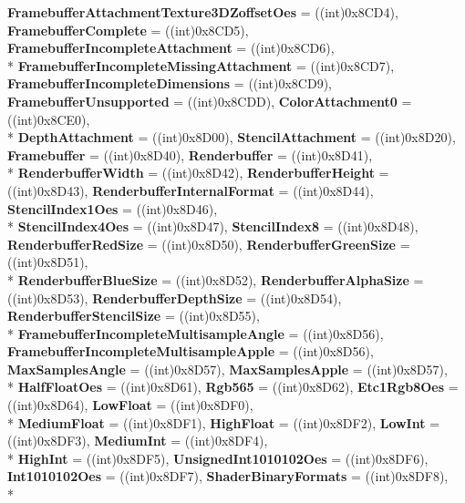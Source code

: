 \begin{DoxyCompactItemize}
{\bfseries Framebuffer\-Attachment\-Texture3\-D\-Zoffset\-Oes} = ((int)0x8\-C\-D4), 
{\bfseries Framebuffer\-Complete} = ((int)0x8\-C\-D5), 
{\bfseries Framebuffer\-Incomplete\-Attachment} = ((int)0x8\-C\-D6), 
\\*
{\bfseries Framebuffer\-Incomplete\-Missing\-Attachment} = ((int)0x8\-C\-D7), 
{\bfseries Framebuffer\-Incomplete\-Dimensions} = ((int)0x8\-C\-D9), 
{\bfseries Framebuffer\-Unsupported} = ((int)0x8\-C\-D\-D), 
{\bfseries Color\-Attachment0} = ((int)0x8\-C\-E0), 
\\*
{\bfseries Depth\-Attachment} = ((int)0x8\-D00), 
{\bfseries Stencil\-Attachment} = ((int)0x8\-D20), 
{\bfseries Framebuffer} = ((int)0x8\-D40), 
{\bfseries Renderbuffer} = ((int)0x8\-D41), 
\\*
{\bfseries Renderbuffer\-Width} = ((int)0x8\-D42), 
{\bfseries Renderbuffer\-Height} = ((int)0x8\-D43), 
{\bfseries Renderbuffer\-Internal\-Format} = ((int)0x8\-D44), 
{\bfseries Stencil\-Index1\-Oes} = ((int)0x8\-D46), 
\\*
{\bfseries Stencil\-Index4\-Oes} = ((int)0x8\-D47), 
{\bfseries Stencil\-Index8} = ((int)0x8\-D48), 
{\bfseries Renderbuffer\-Red\-Size} = ((int)0x8\-D50), 
{\bfseries Renderbuffer\-Green\-Size} = ((int)0x8\-D51), 
\\*
{\bfseries Renderbuffer\-Blue\-Size} = ((int)0x8\-D52), 
{\bfseries Renderbuffer\-Alpha\-Size} = ((int)0x8\-D53), 
{\bfseries Renderbuffer\-Depth\-Size} = ((int)0x8\-D54), 
{\bfseries Renderbuffer\-Stencil\-Size} = ((int)0x8\-D55), 
\\*
{\bfseries Framebuffer\-Incomplete\-Multisample\-Angle} = ((int)0x8\-D56), 
{\bfseries Framebuffer\-Incomplete\-Multisample\-Apple} = ((int)0x8\-D56), 
{\bfseries Max\-Samples\-Angle} = ((int)0x8\-D57), 
{\bfseries Max\-Samples\-Apple} = ((int)0x8\-D57), 
\\*
{\bfseries Half\-Float\-Oes} = ((int)0x8\-D61), 
{\bfseries Rgb565} = ((int)0x8\-D62), 
{\bfseries Etc1\-Rgb8\-Oes} = ((int)0x8\-D64), 
{\bfseries Low\-Float} = ((int)0x8\-D\-F0), 
\\*
{\bfseries Medium\-Float} = ((int)0x8\-D\-F1), 
{\bfseries High\-Float} = ((int)0x8\-D\-F2), 
{\bfseries Low\-Int} = ((int)0x8\-D\-F3), 
{\bfseries Medium\-Int} = ((int)0x8\-D\-F4), 
\\*
{\bfseries High\-Int} = ((int)0x8\-D\-F5), 
{\bfseries Unsigned\-Int1010102\-Oes} = ((int)0x8\-D\-F6), 
{\bfseries Int1010102\-Oes} = ((int)0x8\-D\-F7), 
{\bfseries Shader\-Binary\-Formats} = ((int)0x8\-D\-F8), 
\\*

\end{DoxyCompactItemize}
